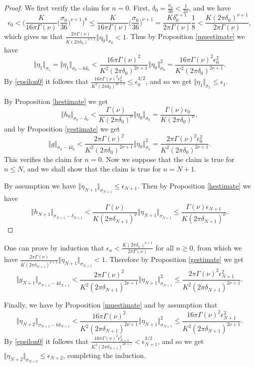 \documentclass{article}
\newcommand{\norm}[1]{\Vert #1 \Vert}
\begin{document}
\begin{proof}
We first verify the claim for $n=0$. 
First,
$\delta_0=\frac{\sigma_0}{36}<\frac{1}{2\pi}$, and we have
\[
\epsilon_0 < \Big( \frac{K}{16\pi \Gamma(\nu)} \Big( \frac{\sigma_0}{36} \Big)^{\nu+1} \Big)^8
\leq \frac{K}{16\pi \Gamma(\nu)} \Big( \frac{\sigma_0}{36} \Big)^{\nu+1} 
=\frac{K \delta_0^{\nu+1}}{2\pi \Gamma(\nu)} \frac{1}{8}
<\frac{K(2\pi \delta_0)^{\nu+1}}{2\pi\Gamma(\nu)},
\]
which gives us that
$\frac{2\pi \Gamma(\nu)}{K(2\pi \delta_0)^{\nu+1}}\norm{\eta_0}_{\sigma_0}<1$.  
Thus by Proposition \ref{muestimate} we have
\[
\norm{\eta_1}_{\sigma_1}=\norm{\eta_1}_{\sigma_0-6\delta_0}
< \frac{16\pi \Gamma(\nu)^2}{K^2(2\pi \delta_0)^{2\nu+1}} \norm{\eta_0}_{\sigma_0}^2
=\frac{16\pi \Gamma(\nu)^2 \epsilon_0^2 }{K^2(2\pi \delta_0)^{2\nu+1}}.
\]
By \eqref{epsilon0} it follows that
$\frac{16\pi \Gamma(\nu)^2 \epsilon_0^2 }{K^2(2\pi \delta_0)^{2\nu+1}} \leq \epsilon_0^{3/2}$,
and so we get
$\norm{\eta_1}_{\sigma_1} \leq \epsilon_1$.

By Proposition \ref{hestimate} we get
\[
\norm{h_0}_{\sigma_0-\delta_0} < \frac{\Gamma(\nu)}{K(2\pi \delta_0)^\nu}\norm{\eta_0}_{\sigma_0}
= \frac{\Gamma(\nu)\epsilon_0}{K(2\pi \delta_0)^\nu},
\]
and by Proposition \ref{gestimate} we get
\[
\norm{g}_{\sigma_0-4\delta_0} < \frac{2\pi \Gamma(\nu)^2}{K^2(2\pi \delta_0)^{2\nu+1}}\norm{\eta_0}_{\sigma_0}^2
=\frac{2\pi\Gamma(\nu)^2\epsilon_0^2}{K^2(2\pi \delta_0)^{2\nu+1}}.
\]
This verifies the claim for $n=0$. Now we suppose that the claim is true for $n \leq N$, and we shall show that the claim is true for $n=N+1$. 

By assumption we have $\norm{\eta_{N+1}}_{\sigma_{N+1}} \leq \epsilon_{N+1}$.
Then by
Proposition \ref{hestimate} we have
\[
\norm{h_{N+1}}_{\sigma_{N+1}-\delta_{N+1}} <
\frac{\Gamma(\nu)}{K(2\pi \delta_{N+1})^\nu}\norm{\eta_{N+1}}_{\sigma_{N+1}}
\leq \frac{\Gamma(\nu)  \epsilon_{N+1}}{K(2\pi \delta_{N+1})^\nu}.
\]
\end{proof}
One can prove by induction that $\epsilon_n<\frac{K(2\pi \delta_n)^{\nu+1}}{2\pi\Gamma(\nu)}$ for all
$n \geq 0$, from which we have $\frac{2\pi \Gamma(\nu)}{K(2\pi \delta_{N+1})^{\nu+1}}\norm{\eta_{N+1}}_{\sigma_{N+1}}<1$. Therefore by Proposition \ref{gestimate} we get
\[
\norm{g_{N+1}}_{\sigma_{N+1}-4\delta_{N+1}} < \frac{2\pi \Gamma(\nu)^2}{K^2(2\pi \delta_{N+1})^{2\nu+1}}\norm{\eta_{N+1}}_{\sigma_{N+1}}^2 \leq
\frac{2\pi\Gamma(\nu)^2\epsilon_{N+1}^2}{K^2(2\pi \delta_{N+1})^{2\nu+1}}.
\]

Finally, we have by Proposition \ref{muestimate} and by assumption that
\[
\norm{\eta_{N+2}}_{\sigma_{N+1}-6\delta_{N+1}} < \frac{16\pi \Gamma(\nu)^2}{K^2(2\pi \delta_{N+1})^{2\nu+1}} \norm{\eta_{N+1}}_{\sigma_{N+1}}^2
\leq \frac{16\pi \Gamma(\nu)^2 \epsilon_{N+1}^2}{K^2(2\pi \delta_{N+1})^{2\nu+1}}.
\]
By \eqref{epsilon0} it follows that $\frac{16\pi \Gamma(\nu)^2 \epsilon_{N+1}^2}{K^2(2\pi \delta_{N+1})^{2\nu+1}} < \epsilon_{N+1}^{3/2}$, and so we get $\norm{\eta_{N+2}}_{\sigma_{N+2}}
\leq \epsilon_{N+2}$, completing the induction.
\end{document}
